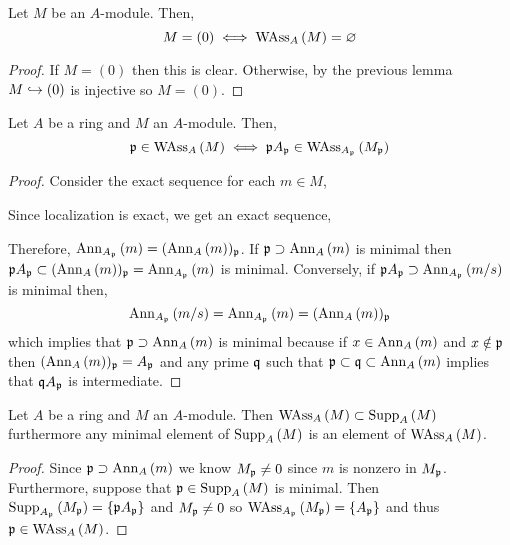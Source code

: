 \documentclass[12pt]{article}
\begin{document}
\begin{lemma}
Let $M$ be an $A$-module. Then,
\[ M = (0) \iff \WAss{A}{M} = \empty \]
\end{lemma}

\begin{proof}
If $M = (0)$ then this is clear. Otherwise, by the previous lemma $M \embed (0)$ is injective so $M = (0)$. 
\end{proof}

\begin{lemma} \label{weak_ass_primes_localization}
Let $A$ be a ring and $M$ an $A$-module. Then,
\[ \p \in \WAss{A}{M} \iff \p A_\p \in \WAss{A_\p}{M_\p} \]
\end{lemma}

\begin{proof}
Consider the exact sequence for each $m \in M$,
\begin{center}
\end{center}
Since localization is exact, we get an exact sequence,
\begin{center}
\end{center}
Therefore, $\Ann{A_\p}{m} = (\Ann{A}{m})_\p$. If $\p \supset \Ann{A}{m}$ is minimal then $\p A_\p \subset (\Ann{A}{m})_\p = \Ann{A_\p}{m}$ is minimal. Conversely, if $\p A_\p \supset \Ann{A_\p}{m/s}$ is minimal then,
\[ \Ann{A_\p}{m/s} = \Ann{A_\p}{m} = (\Ann{A}{m})_\p \]
which implies that $\p \supset \Ann{A}{m}$ is minimal because if $x \in \Ann{A}{m}$ and $x \notin \p$ then $(\Ann{A}{m})_\p = A_\p$ and any prime $\q$ such that $\p \subset \q \subset \Ann{A}{m}$ implies that $\q A_\p$ is intermediate.
\end{proof}

\begin{lemma} \label{minimal_supp_wass}
Let $A$ be a ring and $M$ an $A$-module. Then $\WAss{A}{M} \subset \Supp{A}{M}$ furthermore any minimal element of $\Supp{A}{M}$ is an element of $\WAss{A}{M}$.
\end{lemma}

\begin{proof}
Since $\p \supset \Ann{A}{m}$ we know $M_\p \neq 0$ since $m$ is nonzero in $M_\p$. Furthermore, suppose that $\p \in \Supp{A}{M}$ is minimal. Then $\Supp{A_\p}{M_\p} = \{ \p A_\p \}$ and $M_\p \neq 0$ so $\WAss{A_\p}{M_\p} = \{ A_\p \}$ and thus $\p \in \WAss{A}{M}$.
\end{proof}
\end{document}
